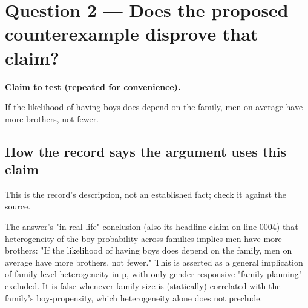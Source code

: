 \documentclass[11pt]{article}
\begin{document}
\section*{Question 2 --- Does the proposed counterexample disprove that claim?}
\textbf{Claim to test (repeated for convenience).}
\begin{Vsrc}
If the likelihood of having boys does depend on the family, men on average have more brothers, not fewer.
\end{Vsrc}
\subsection*{How the record says the argument uses this claim}
This is the record's description, not an established fact; check it against the source.
\begin{Vsrc}
The answer's "in real life" conclusion (also its headline claim on line 0004) that heterogeneity of the boy-probability across families implies men have more brothers: "If the likelihood of having boys does depend on the family, men on average have more brothers, not fewer." This is asserted as a general implication of family-level heterogeneity in p, with only gender-responsive "family planning" excluded. It is false whenever family size is (statically) correlated with the family's boy-propensity, which heterogeneity alone does not preclude.
\end{Vsrc}
\end{document}

